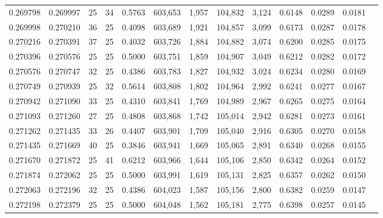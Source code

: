 \begin{tabular}{rrrrrrrrrrrrr}
0.269798 & 0.269997 &    25 &  34 &                                     0.5763 & 603,653 &   1,957 & 104,832 &   3,124 & 0.6148 & 0.0289 & 0.0181 \\
0.269998 & 0.270210 &    36 &  25 &                                     0.4098 & 603,689 &   1,921 & 104,857 &   3,099 & 0.6173 & 0.0287 & 0.0178 \\
0.270216 & 0.270391 &    37 &  25 &                                     0.4032 & 603,726 &   1,884 & 104,882 &   3,074 & 0.6200 & 0.0285 & 0.0175 \\
0.270396 & 0.270576 &    25 &  25 &                                     0.5000 & 603,751 &   1,859 & 104,907 &   3,049 & 0.6212 & 0.0282 & 0.0172 \\
0.270576 & 0.270747 &    32 &  25 &                                     0.4386 & 603,783 &   1,827 & 104,932 &   3,024 & 0.6234 & 0.0280 & 0.0169 \\
0.270749 & 0.270939 &    25 &  32 &                                     0.5614 & 603,808 &   1,802 & 104,964 &   2,992 & 0.6241 & 0.0277 & 0.0167 \\
0.270942 & 0.271090 &    33 &  25 &                                     0.4310 & 603,841 &   1,769 & 104,989 &   2,967 & 0.6265 & 0.0275 & 0.0164 \\
0.271093 & 0.271260 &    27 &  25 &                                     0.4808 & 603,868 &   1,742 & 105,014 &   2,942 & 0.6281 & 0.0273 & 0.0161 \\
0.271262 & 0.271435 &    33 &  26 &                                     0.4407 & 603,901 &   1,709 & 105,040 &   2,916 & 0.6305 & 0.0270 & 0.0158 \\
0.271435 & 0.271669 &    40 &  25 &                                     0.3846 & 603,941 &   1,669 & 105,065 &   2,891 & 0.6340 & 0.0268 & 0.0155 \\
0.271670 & 0.271872 &    25 &  41 &                                     0.6212 & 603,966 &   1,644 & 105,106 &   2,850 & 0.6342 & 0.0264 & 0.0152 \\
0.271874 & 0.272062 &    25 &  25 &                                     0.5000 & 603,991 &   1,619 & 105,131 &   2,825 & 0.6357 & 0.0262 & 0.0150 \\
0.272063 & 0.272196 &    32 &  25 &                                     0.4386 & 604,023 &   1,587 & 105,156 &   2,800 & 0.6382 & 0.0259 & 0.0147 \\
0.272198 & 0.272379 &    25 &  25 &                                     0.5000 & 604,048 &   1,562 & 105,181 &   2,775 & 0.6398 & 0.0257 & 0.0145 \\

\end{tabular}
